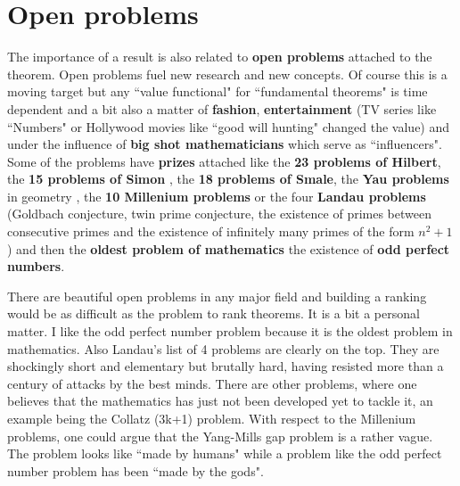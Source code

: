 \documentclass[12pt]{amsart}
\newcounter{example}    \def\example#1{ \item \fontsize{12}{15} \selectfont #1 \fontsize{12}{15} \selectfont }
\begin{document}
\section*{Open problems} 

The importance of a result is also related to {\bf open problems} attached to 
the theorem. Open problems fuel new research and new concepts. Of course this is a moving target
but any ``value functional" for ``fundamental theorems" is time dependent and a bit
also a matter of {\bf fashion}, {\bf entertainment} (TV series like ``Numbers" or
Hollywood movies like ``good will hunting" changed the value) 
and under the influence of {\bf big shot mathematicians} which serve as ``influencers". 
Some of the problems have {\bf prizes} attached like the {\bf 23 problems of Hilbert}, 
the {\bf 15 problems of Simon} \cite{Simon15Problems}, the {\bf 18 problems of Smale},
the {\bf Yau problems} in geometry \cite{YauSeminar1982},
the {\bf 10 Millenium problems} or the four {\bf Landau problems} (Goldbach conjecture, twin prime conjecture,
the existence of primes between consecutive primes and the existence of infinitely many primes of the 
form $n^2+1$) and then the {\bf oldest problem of mathematics} the existence of {\bf odd perfect numbers}.

There are beautiful open problems in any major field and
building a ranking would be as difficult as the problem to rank theorems. It is a bit a personal matter. 
I like the odd perfect number problem because it is the oldest problem in mathematics. 
Also Landau's list of 4 problems are clearly on the top. They are shockingly short and elementary but brutally hard,
having resisted more than a century of attacks by the best minds. There are other problems, where
one believes that the mathematics has just not been developed yet to tackle it, 
an example being the Collatz (3k+1) problem. With respect to the Millenium problems, one could argue that
the Yang-Mills gap problem is a rather vague. The problem looks like ``made by humans" while a problem like the 
odd perfect number problem has been ``made by the gods". 
\end{document}
